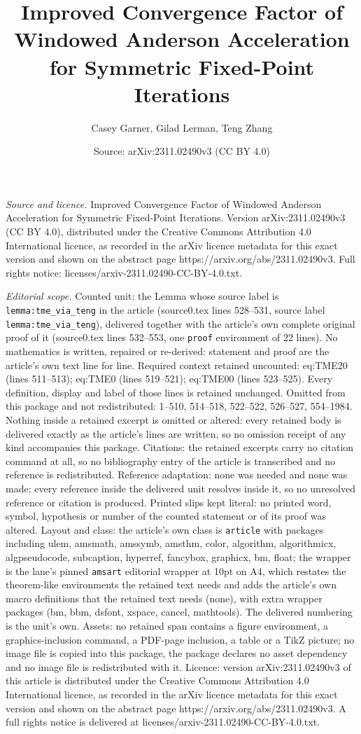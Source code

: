 \documentclass[10pt,a4paper]{amsart}
\title[Improved Convergence Factor of Windowed Anderson Acceleratio]{Improved Convergence Factor of Windowed Anderson Acceleration for Symmetric Fixed-Point Iterations}
\author{Casey Garner, Gilad Lerman, Teng Zhang}
\date{Source: arXiv:2311.02490v3 (CC BY 4.0)}
\begin{document}
\maketitle

\noindent\emph{Source and licence.} Improved Convergence Factor of Windowed Anderson Acceleration for Symmetric Fixed-Point Iterations. Version arXiv:2311.02490v3 (CC BY 4.0), distributed under the Creative Commons Attribution 4.0 International licence, as recorded in the arXiv licence metadata for this exact version and shown on the abstract page https://arxiv.org/abs/2311.02490v3. Full rights notice: licenses/arxiv-2311.02490-CC-BY-4.0.txt.\par\smallskip

\noindent\textit{Editorial scope.} Counted unit: the Lemma whose source label is \texttt{lemma:tme\_via\_teng} in the article (source0.tex lines 528--531, source label \texttt{lemma:tme\_via\_teng}), delivered together with the article's own complete original proof of it (source0.tex lines 532--553, one \texttt{proof} environment of 22 lines). No mathematics is written, repaired or re-derived: statement and proof are the article's own text line for line. Required context retained uncounted: eq:TME20 (lines 511--513); eq:TME0 (lines 519--521); eq:TME00 (lines 523--525). Every definition, display and label of those lines is retained unchanged. Omitted from this package and not redistributed: 1--510, 514--518, 522--522, 526--527, 554--1984. Nothing inside a retained excerpt is omitted or altered: every retained body is delivered exactly as the article's lines are written, so no omission receipt of any kind accompanies this package. Citations: the retained excerpts carry no citation command at all, so no bibliography entry of the article is transcribed and no reference is redistributed. Reference adaptation: none was needed and none was made; every reference inside the delivered unit resolves inside it, so no unresolved reference or citation is produced. Printed slips kept literal: no printed word, symbol, hypothesis or number of the counted statement or of its proof was altered. Layout and class: the article's own class is \texttt{article} with packages including ulem, amsmath, amssymb, amsthm, color, algorithm, algorithmicx, algpseudocode, subcaption, hyperref, fancybox, graphicx, bm, float; the wrapper is the lane's pinned \texttt{amsart} editorial wrapper at 10pt on A4, which restates the theorem-like environments the retained text needs and adds the article's own macro definitions that the retained text needs (none), with extra wrapper packages (bm, bbm, dsfont, xspace, cancel, mathtools). The delivered numbering is the unit's own. Assets: no retained span contains a figure environment, a graphics-inclusion command, a PDF-page inclusion, a table or a TikZ picture; no image file is copied into this package, the package declares no asset dependency and no image file is redistributed with it. Licence: version arXiv:2311.02490v3 of this article is distributed under the Creative Commons Attribution 4.0 International licence, as recorded in the arXiv licence metadata for this exact version and shown on the abstract page https://arxiv.org/abs/2311.02490v3. A full rights notice is delivered at licenses/arxiv-2311.02490-CC-BY-4.0.txt. 
\end{document}
